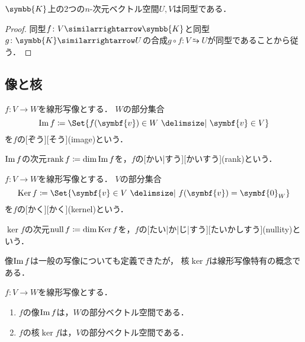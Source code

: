 \documentclass[../sotsu.tex]{subfiles}
\begin{document}
\begin{corollary}
    $\symbb{K}$上の2つの$n$-次元ベクトル空間$U, V$は同型である．
\end{corollary}

\begin{proof}
    同型$f \colon V \similarrightarrow \symbb{K}$と同型$g \colon \symbb{K} \similarrightarrow U$の合成$g \circ f \colon V \similarrightarrow U$が同型であることから従う．
\end{proof}


\subsection{像と核}

\begin{definition}[像]
    \label{dfn:image-of-linear-map}
    \label{dfn:rank}
    $f \colon V \to W$を線形写像とする．
    $W$の部分集合
    \begin{equation}
        \image f  \coloneq  \Set{  f(\symbf{v}) \in W  \given  \symbf{v} \in V  }
    \end{equation}
    を$f$の[ぞう][そう](image)という．

    $\operatorname{Im} f$の次元$\operatorname{rank} f \coloneq \dim \operatorname{Im} f$を，$f$の[かい|すう][かいすう](rank)という\cite{miyake-lin-2008}．
\end{definition}

\begin{definition}[核]
    \label{dfn:kernel-of-linear-map}
    \label{dfn:nullity}
    $f \colon V \to W$を線形写像とする．
    $V$の部分集合
    \begin{equation}
        \ker f  \coloneq  \Set{  \symbf{v} \in V  \given  f(\symbf{v}) = \symbf{0}_W  }
    \end{equation}
    を$f$の[かく][かく](kernel)という．

    $\ker f$の次元$\operatorname{null} f \coloneq \dim \operatorname{Ker} f$を，$f$の[たい|か|じ|すう][たいかしすう](nullity)という\cite{miyake-lin-2008}．
\end{definition}

像$\operatorname{Im} f$は一般の写像についても定義できたが，
核$\ker f$は線形写像特有の概念である．



\begin{proposition}
    $f \colon V \to W$を線形写像とする．
    \begin{enumerate}
        \item $f$の像$\operatorname{Im} f$は，$W$の部分ベクトル空間である．
        \item $f$の核$\ker f$は，$V$の部分ベクトル空間である．
    \end{enumerate}
\end{proposition}
\end{document}

